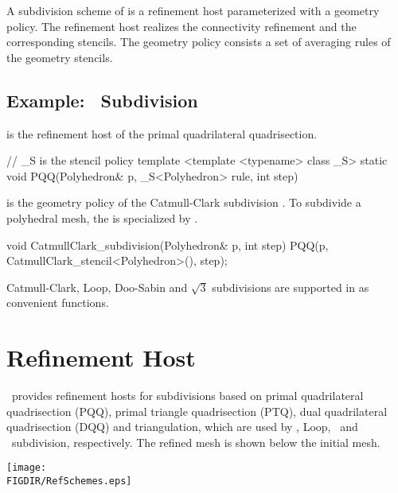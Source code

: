 A subdivision scheme of  is a 
refinement host parameterized with a geometry policy. The refinement
host realizes the connectivity refinement and the corresponding
stencils. The geometry policy consists a set of averaging rules
of the geometry stencils.

\subsection{Example: \CC\ Subdivision}
 is the refinement host of
the primal quadrilateral quadrisection.

\begin{ccExampleCode}
  // _S is the stencil policy
  template <template <typename> class _S>
  static void PQQ(Polyhedron& p, _S<Polyhedron> rule, int step)
\end{ccExampleCode}

 is the geometry policy of the
Catmull-Clark subdivision \cite{cc}. To subdivide a polyhedral
mesh, the  is specialized
by .

\begin{ccExampleCode}
  void CatmullClark_subdivision(Polyhedron& p, int step) {
    PQQ(p, CatmullClark_stencil<Polyhedron>(), step);
  }
\end{ccExampleCode}

Catmull-Clark, Loop, Doo-Sabin and $\sqrt{3}$ subdivisions are supported
in  as convenient functions.

\section{Refinement Host}
\ provides refinement hosts for subdivisions based on
primal quadrilateral quadrisection (PQQ), primal triangle 
quadrisection (PTQ), dual quadrilateral quadrisection (DQQ) and 
 triangulation, which are used by \CC, Loop, \DS\ and
\ subdivision, respectively. The refined mesh is shown below 
the initial mesh.

\begin{ccTexOnly}
  \begin{center}
    \parbox{0.6\textwidth}{%
      \texttt{[image: \\FIGDIR/RefSchemes.eps]}%
    }
  \end{center}
\end{ccTexOnly}

